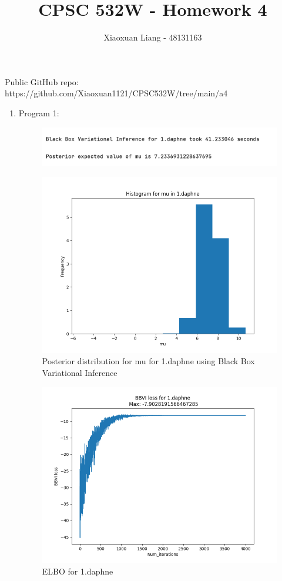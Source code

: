 \documentclass{article}
\title{ \normalfont \normalsize 
\huge CPSC 532W - Homework 4}
\date{}
\author{Xiaoxuan Liang - 48131163}
\begin{document}
\maketitle

Public GitHub repo: https://github.com/Xiaoxuan1121/CPSC532W/tree/main/a4
\begin{enumerate}
\item Program 1:

\begin{figure}[!ht]
	\centering
	\includegraphics[scale=0.5]{../figs/1_daphne_results}
\end{figure}

\begin{figure}[!ht]
	\centering
	\includegraphics[scale=0.5]{../figs/1_daphne_histogram}
	\caption{Posterior distribution for mu for 1.daphne using Black Box Variational Inference}
\end{figure}

\begin{figure}[!ht]
	\centering
	\includegraphics[scale=0.5]{../figs/1_daphne_ELBO}
	\caption{ELBO for 1.daphne}
\end{figure}


\end{enumerate}
\end{document}
